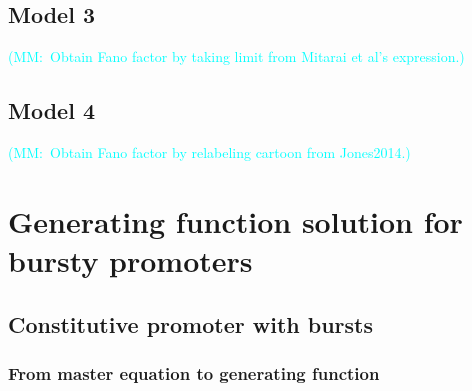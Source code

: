 \documentclass[12pt]{article}%
\newcommand{\mmnote}[1]{\textcolor{cyan}{(MM:~#1)}}
\begin{document}
\subsection{Model 3}
\mmnote{Obtain Fano factor by taking limit from Mitarai et al's expression.}
\subsection{Model 4}
\mmnote{Obtain Fano factor by relabeling cartoon from Jones2014.}

\section{Generating function solution for bursty promoters}

\subsection{Constitutive promoter with bursts}

\subsubsection{From master equation to generating function}
\end{document}
